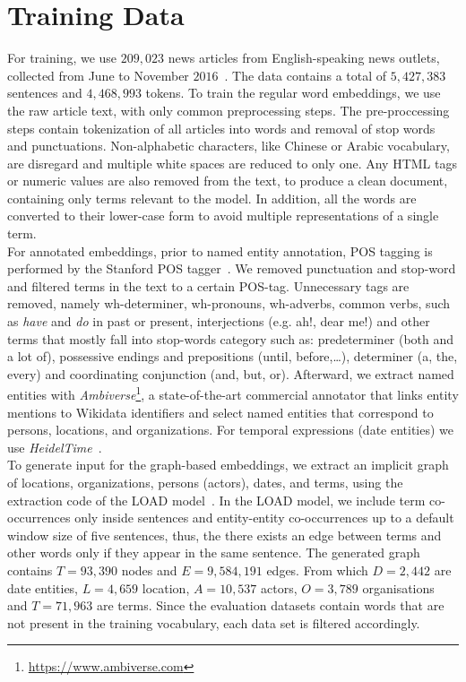 \section{Training Data}\label{sec:data}
For training, we use $209,023$ news articles from English-speaking news outlets, collected from June to November $2016$~. The data contains a total of $5,427,383$ sentences and $4,468,993$ tokens. To train the regular word embeddings, we use the raw article text, with only common preprocessing steps. The pre-proccessing steps contain tokenization of all articles into words and removal of stop words and punctuations. Non-alphabetic characters, like Chinese or Arabic vocabulary, are disregard and multiple white spaces are reduced to only one.  Any HTML tags or numeric values are also removed from the text, to produce a clean document, containing only terms relevant to the model. In addition, all the words are converted to their lower-case form to avoid multiple representations of a single term.\\
For annotated embeddings, prior to named entity annotation, POS tagging is performed by the Stanford POS tagger~. 
We removed punctuation and stop-word and filtered terms in the text to a certain POS-tag. Unnecessary tags are removed, namely  wh-determiner, wh-pronouns, wh-adverbs, common verbs, such as  \emph{have} and  \emph{do} in past or present, interjections (e.g. ah!, dear me!) and other terms that mostly fall into stop-words category such as: predeterminer (both and a lot of), possessive endings and prepositions (until, before,\dots), determiner (a, the, every) and coordinating conjunction (and, but, or). Afterward, we extract named entities with \emph{Ambiverse}\footnote{\url{https://www.ambiverse.com}}, a state-of-the-art commercial annotator that links entity mentions to Wikidata identifiers and select named entities that correspond to persons, locations, and organizations. For temporal expressions (date entities) we use \emph{HeidelTime}~.\\
To generate input for the graph-based embeddings, we extract an   implicit graph of locations, organizations, persons (actors), dates, and terms, using the extraction code of the LOAD model~. In the LOAD model, we include term co-occurrences only inside sentences and entity-entity co-occurrences up to a default window size of five sentences, thus, the there exists an edge between terms and other words only if they appear in the same sentence. The generated graph contains $T=93,390$ nodes and $E=9,584,191$ edges. From which $D=2,442$  are date entities, $L=4,659$ location, $A=10,537$ actors, $O=3,789$ organisations and $T=71,963$ are terms. Since the evaluation datasets contain words that are not present in the training vocabulary, each data set is filtered accordingly.
